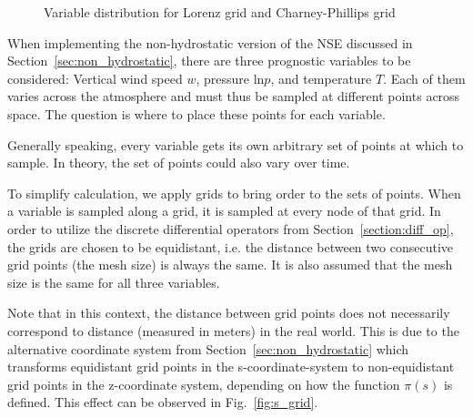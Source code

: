 \begin{figure}[ht]
    \caption{Variable distribution for Lorenz grid and Charney-Phillips grid}
    \label{fig:lorenz_cp}
\end{figure}
\noindent
When implementing the non-hydrostatic version of the NSE discussed in Section~\ref{sec:non_hydrostatic}, there are three prognostic variables to be considered: Vertical wind speed $w$, pressure $\text{ln}p$, and temperature $T$.
Each of them varies across the atmosphere and must thus be sampled at different points across space.
The question is where to place these points for each variable.

Generally speaking, every variable gets its own arbitrary set of points at which to sample.
In theory, the set of points could also vary over time.

To simplify calculation, we apply grids to bring order to the sets of points.
When a variable is sampled along a grid, it is sampled at every node of that grid.
In order to utilize the discrete differential operators from Section~\ref{section:diff_op}, the grids are chosen to be equidistant, i.e. the distance between two consecutive grid points (the mesh size) is always the same.
It is also assumed that the mesh size is the same for all three variables.

Note that in this context, the distance between grid points does not necessarily correspond to distance (measured in meters) in the real world.
This is due to the alternative coordinate system from Section~\ref{sec:non_hydrostatic} which transforms equidistant grid points in the s-coordinate-system to non-equidistant grid points in the z-coordinate system, depending on how the function $\pi(s)$ is defined.
This effect can be observed in Fig.~\ref{fig:s_grid}.


